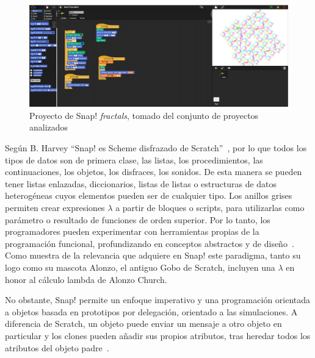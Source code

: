 \documentclass[a4paper, 12pt]{book}
\begin{document}
\begin{figure}[H]
    \centering
    \includegraphics[width=1\textwidth]{img/proy_Snap.png}
    \caption{Proyecto de Snap! \emph{fractals}, tomado del conjunto de proyectos analizados}
    \label{fig:fractal}
\end{figure}

Según B. Harvey ``Snap! es Scheme disfrazado de Scratch''~\cite[p. 3]{harvey2017snap}, por lo que todos los tipos de datos son de primera clase, las listas, los procedimientos, las continuaciones, los objetos, los disfraces, los sonidos. De esta manera se pueden tener listas enlazadas, diccionarios, listas de listas o estructuras de datos heterogéneas cuyos elementos pueden ser de cualquier tipo. Los anillos grises permiten crear expresiones $\lambda$ a partir de bloques o scripts, para utilizarlas como parámetro o resultado de funciones de orden superior.
Por lo tanto, los programadores pueden experimentar con herramientas propias de la programación funcional, profundizando en conceptos abstractos y de diseño~\cite{harvey2015lambda}.
Como muestra de la relevancia que adquiere en Snap! este paradigma, tanto su logo como su mascota Alonzo, el antiguo Gobo de Scratch, incluyen una $\lambda$ en honor al cálculo lambda de Alonzo Church.%

No obstante, Snap! permite un enfoque imperativo y una programación orientada a objetos basada en prototipos por delegación, orientado a las simulaciones. A diferencia de Scratch, un objeto puede enviar un mensaje a otro objeto en particular y los clones pueden añadir sus propios atributos, tras heredar todos los atributos del objeto padre~\cite{snap2022git}. %
\end{document}
